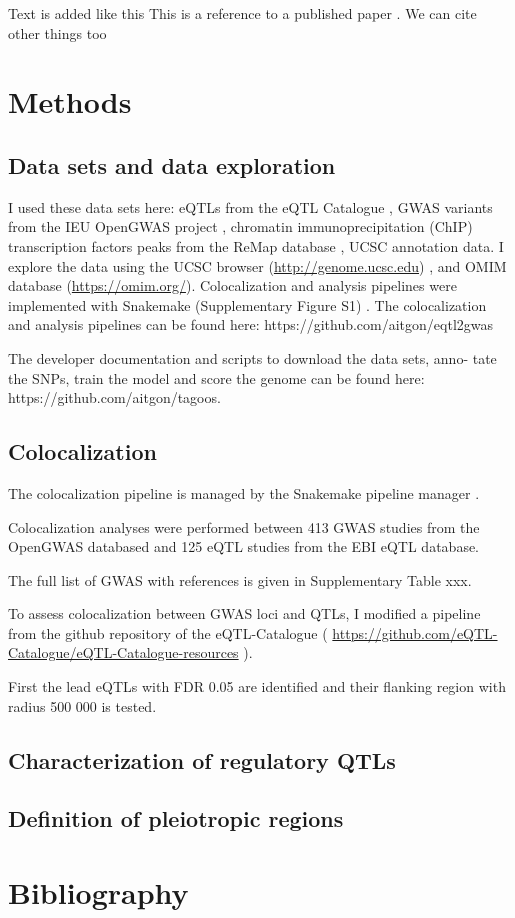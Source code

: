 Text is added like this
This is a reference to a published paper \citep{2019.Watanabe}.
We can cite other things too \citep{watson_molecular_1953}

\section*{Methods}\label{s:methods}

\subsection*{Data sets and data exploration}

I used these data sets here: eQTLs from the eQTL Catalogue \citep{2021.Alasoo.Kerimov}, GWAS variants from the IEU OpenGWAS project \citep{2021.Marcora.Lyon}, chromatin immunoprecipitation (ChIP)	transcription factors peaks from the ReMap database \citep{2021.Ballester.Hammal}, UCSC annotation data.
%
I explore the data using the UCSC browser (\url{http://genome.ucsc.edu}) \citep{2021.Kent.Lee}, and OMIM database (\url{https://omim.org/}). 
%
Colocalization and analysis pipelines were implemented with Snakemake (Supplementary Figure S1) .
%
The colocalization and analysis pipelines can be found here: https://github.com/aitgon/eqtl2gwas


%
The developer documentation and scripts to download the data sets, anno-
tate the SNPs, train the model and score the genome can be
found here: https://github.com/aitgon/tagoos.


\subsection*{Colocalization}

The colocalization pipeline is managed by the Snakemake pipeline manager \citep{2021.Koester.Moelder}.

Colocalization analyses were performed between 413 GWAS studies from the OpenGWAS databased and 125 eQTL studies from the EBI eQTL database.

The full list of GWAS with references is given in Supplementary Table xxx.

To assess colocalization between GWAS loci and QTLs, I modified a pipeline from the github repository of the eQTL-Catalogue ( \url{https://github.com/eQTL-Catalogue/eQTL-Catalogue-resources} ).

First the lead eQTLs with FDR 0.05 are identified and their flanking region with radius 500 000 is tested.

\subsection*{Characterization of regulatory QTLs}


\subsection*{Definition of pleiotropic regions}



\section*{Bibliography}




